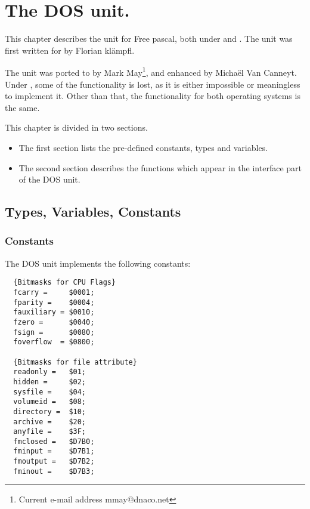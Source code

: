 %
%
%
%
%
\chapter{The DOS unit.}
This chapter describes the  unit for Free pascal, both under \dos
and \linux. The unit was first written for \dos by Florian kl\"ampfl. 

The unit was ported to \linux by Mark May\footnote{Current
e-mail address \textsf{mmay@dnaco.net}}, and enhanced by Micha\"el Van
Canneyt.
Under \linux, some of the functionality is lost, as it is either impossible 
or meaningless to implement it. Other than that, 
the functionality for both operating systems is the same.

This chapter is divided in two sections. 
\begin{itemize}
\item The first section lists the pre-defined constants, types and variables. 
\item The second section describes the functions which appear in the
interface part of the DOS unit.
\end{itemize}

\section{Types, Variables, Constants}
\subsection {Constants}
The DOS unit implements the following constants:
\begin{verbatim}
  {Bitmasks for CPU Flags}
  fcarry =     $0001;
  fparity =    $0004;
  fauxiliary = $0010;
  fzero =      $0040;
  fsign =      $0080;
  foverflow  = $0800;

  {Bitmasks for file attribute}
  readonly =   $01;
  hidden =     $02;
  sysfile =    $04;
  volumeid =   $08;
  directory =  $10;
  archive =    $20;
  anyfile =    $3F;
  fmclosed =   $D7B0;
  fminput =    $D7B1;
  fmoutput =   $D7B2;
  fminout =    $D7B3;
\end{verbatim}
